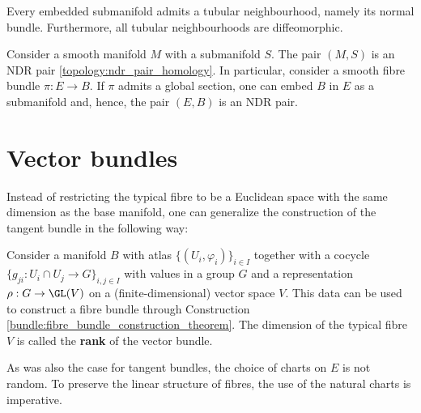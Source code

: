    \begin{theorem}\label{bundle:tubular_neighbourhood_theorem}
        Every embedded submanifold admits a tubular neighbourhood, namely its normal bundle. Furthermore, all tubular neighbourhoods are diffeomorphic.
    \end{theorem}
    \begin{result}\label{bundle:ndr_submanifold}
        Consider a smooth manifold $M$ with a submanifold $S$. The pair $(M,S)$ is an NDR pair \ref{topology:ndr_pair_homology}. In particular, consider a smooth fibre bundle $\pi:E\rightarrow B$. If $\pi$ admits a global section, one can embed $B$ in $E$ as a submanifold and, hence, the pair $(E,B)$ is an NDR pair.
    \end{result}

\section{Vector bundles}

    Instead of restricting the typical fibre to be a Euclidean space with the same dimension as the base manifold, one can generalize the construction of the tangent bundle in the following way:
    \begin{construct}\label{bundle:vector_bundle_construction}
        Consider a manifold $B$ with atlas $\{(U_i,\varphi_i)\}_{i\in I}$ together with a cocycle $\{g_{ji}:U_i\cap U_j\rightarrow G\}_{i,j\in I}$ with values in a group $G$ and a representation $\rho:G\rightarrow\GL(V)$ on a (finite-dimensional) vector space $V$. This data can be used to construct a fibre bundle through Construction \ref{bundle:fibre_bundle_construction_theorem}. The dimension of the typical fibre $V$ is called the \textbf{rank} of the vector bundle.
    \end{construct}
    \begin{remark}
        As was also the case for tangent bundles, the choice of charts on $E$ is not random. To preserve the linear structure of fibres, the use of the natural charts is imperative.
    \end{remark}

